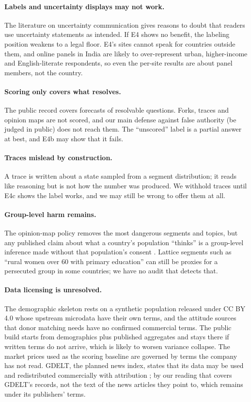 \documentclass[11pt]{article}
\begin{document}
\paragraph{Labels and uncertainty displays may not work.} The literature on uncertainty communication \citep{vanderbles2019communicating,westwood2020projecting,hullman2019error} gives reasons to doubt that readers use uncertainty statements as intended. If E4 shows no benefit, the labeling position weakens to a legal floor. E4's sites cannot speak for countries outside them, and online panels in India are likely to over-represent urban, higher-income and English-literate respondents, so even the per-site results are about panel members, not the country.

\paragraph{Scoring only covers what resolves.} The public record covers forecasts of resolvable questions. Forks, traces and opinion maps are not scored, and our main defense against false authority (be judged in public) does not reach them. The ``unscored'' label is a partial answer at best, and E4b may show that it fails.

\paragraph{Traces mislead by construction.} A trace is written about a state sampled from a segment distribution; it reads like reasoning but is not how the number was produced. We withhold traces until E4c shows the label works, and we may still be wrong to offer them at all.

\paragraph{Group-level harm remains.} The opinion-map policy removes the most dangerous segments and topics, but any published claim about what a country's population ``thinks'' is a group-level inference made without that population's consent \citep{taylor2017group}. Lattice segments such as ``rural women over 60 with primary education'' can still be proxies for a persecuted group in some countries; we have no audit that detects that.

\paragraph{Data licensing is unresolved.} The demographic skeleton rests on a synthetic population released under CC BY 4.0 whose upstream microdata have their own terms, and the attitude sources that donor matching needs have no confirmed commercial terms. The public build starts from demographics plus published aggregates and stays there if written terms do not arrive, which is likely to worsen variance collapse. The market prices used as the scoring baseline are governed by terms the company has not read. GDELT, the planned news index, states that its data may be used and redistributed commercially with attribution \citep{gdelt_terms}; by our reading that covers GDELT's records, not the text of the news articles they point to, which remains under its publishers' terms.
\end{document}

